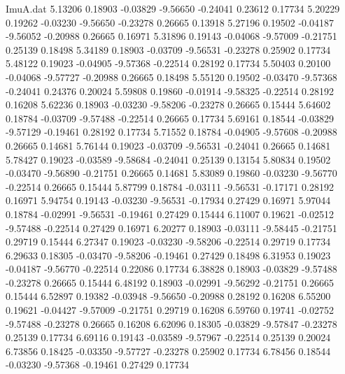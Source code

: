 \begin{filecontents}{ImuA.dat}
   5.13206    0.18903   -0.03829   -9.56650   -0.24041    0.23612    0.17734
   5.20229    0.19262   -0.03230   -9.56650   -0.23278    0.26665    0.13918
   5.27196    0.19502   -0.04187   -9.56052   -0.20988    0.26665    0.16971
   5.31896    0.19143   -0.04068   -9.57009   -0.21751    0.25139    0.18498
   5.34189    0.18903   -0.03709   -9.56531   -0.23278    0.25902    0.17734
   5.48122    0.19023   -0.04905   -9.57368   -0.22514    0.28192    0.17734
   5.50403    0.20100   -0.04068   -9.57727   -0.20988    0.26665    0.18498
   5.55120    0.19502   -0.03470   -9.57368   -0.24041    0.24376    0.20024
   5.59808    0.19860   -0.01914   -9.58325   -0.22514    0.28192    0.16208
   5.62236    0.18903   -0.03230   -9.58206   -0.23278    0.26665    0.15444
   5.64602    0.18784   -0.03709   -9.57488   -0.22514    0.26665    0.17734
   5.69161    0.18544   -0.03829   -9.57129   -0.19461    0.28192    0.17734
   5.71552    0.18784   -0.04905   -9.57608   -0.20988    0.26665    0.14681
   5.76144    0.19023   -0.03709   -9.56531   -0.24041    0.26665    0.14681
   5.78427    0.19023   -0.03589   -9.58684   -0.24041    0.25139    0.13154
   5.80834    0.19502   -0.03470   -9.56890   -0.21751    0.26665    0.14681
   5.83089    0.19860   -0.03230   -9.56770   -0.22514    0.26665    0.15444
   5.87799    0.18784   -0.03111   -9.56531   -0.17171    0.28192    0.16971
   5.94754    0.19143   -0.03230   -9.56531   -0.17934    0.27429    0.16971
   5.97044    0.18784   -0.02991   -9.56531   -0.19461    0.27429    0.15444
   6.11007    0.19621   -0.02512   -9.57488   -0.22514    0.27429    0.16971
   6.20277    0.18903   -0.03111   -9.58445   -0.21751    0.29719    0.15444
   6.27347    0.19023   -0.03230   -9.58206   -0.22514    0.29719    0.17734
   6.29633    0.18305   -0.03470   -9.58206   -0.19461    0.27429    0.18498
   6.31953    0.19023   -0.04187   -9.56770   -0.22514    0.22086    0.17734
   6.38828    0.18903   -0.03829   -9.57488   -0.23278    0.26665    0.15444
   6.48192    0.18903   -0.02991   -9.56292   -0.21751    0.26665    0.15444
   6.52897    0.19382   -0.03948   -9.56650   -0.20988    0.28192    0.16208
   6.55200    0.19621   -0.04427   -9.57009   -0.21751    0.29719    0.16208
   6.59760    0.19741   -0.02752   -9.57488   -0.23278    0.26665    0.16208
   6.62096    0.18305   -0.03829   -9.57847   -0.23278    0.25139    0.17734
   6.69116    0.19143   -0.03589   -9.57967   -0.22514    0.25139    0.20024
   6.73856    0.18425   -0.03350   -9.57727   -0.23278    0.25902    0.17734
   6.78456    0.18544   -0.03230   -9.57368   -0.19461    0.27429    0.17734

\end{filecontents}

